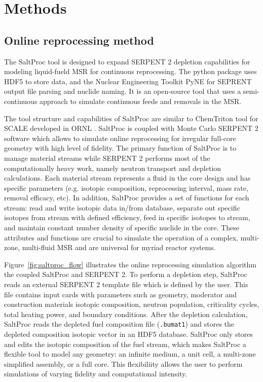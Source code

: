 
\section{Methods}


\subsection{Online reprocessing method}

The SaltProc tool is designed to expand SERPENT 2 depletion capabilities for modeling liquid-fueld \gls{MSR} for continuous reprocessing.
The python package uses HDF5 \cite{the_hdf_group_hierarchial_1997} to store data, and the Nuclear Engineering Toolkit PyNE \cite{scopatz_pyne:_2012}
for SEPRENT output file parsing and nuclide naming. It is an open-source tool that uses a semi-continuous approach to 
simulate continuous feeds and removals in the \gls{MSR}.

The tool structure and capabilities of SaltProc are similar to ChemTriton tool for SCALE developed in \gls{ORNL} \cite{powers_new_2013}.
SaltProc is coupled with Monte Carlo SERPENT 2 software which allows to simulate online reprocessing for irregular full-core geometry with high level of fidelity.  The primary function of SaltProc is to manage material streams while SERPENT 2 performs most of the computationally heavy work, namely neutron transport and depletion calculations. Each material stream represents a fluid in the core design and has specific parameters (e.g. isotopic composition, reprocessing interval, mass rate, removal efficacy, etc). In addition, SaltProc provides a set of functions for each stream: read and write isotopic data in/from database, separate out specific isotopes from stream with defined efficiency, feed in specific isotopes to stream, and maintain constant number density of specific nuclide in the core. These attributes and functions are crucial to simulate the operation of a complex, multi-zone, multi-fluid \gls{MSR} and are universal for myriad reactor systems.

Figure~\ref{fig:saltproc_flow} illustrates the  online reprocessing simulation algorithm the coupled SaltProc and SERPENT 2. To perform a depletion step,
SaltProc reads an external SERPENT 2 template file which is defined by the user. This file contains input cards with parameters such as geometry,
moderator and construction materials isotopic composition, neutron population, criticality cycles, total heating power, and boundary conditions.
After the depletion calculation, SaltProc reads the depleted fuel composition file (\texttt{.bumat1}) and stores the depleted
composition isotopic vector in an HDF5 database. SaltProc only stores and edits the isotopic composition of the fuel stream,
which makes SaltProc a flexible tool to model any geometry: an infinite medium, a unit cell, a multi-zone simplified assembly, or a full core.
This flexibiliity allows the user to perform simulations of varying fidelity and computational intensity.

